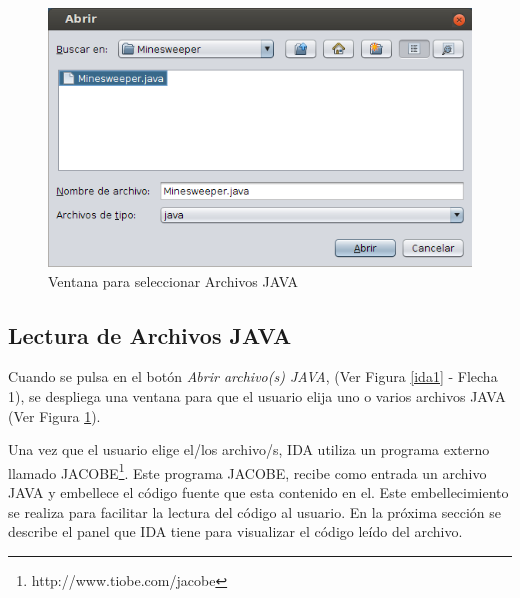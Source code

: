 \pagebreak

\begin{figure}[t] %
\centerline{%
\includegraphics[scale= 0.7]{./cap4/ida_02.png}
}
\caption{Ventana para seleccionar Archivos JAVA}
\label{ida2}
\end{figure}

\vspace{-1em}

\subsection{Lectura de Archivos JAVA}

Cuando se pulsa en el botón \textit{Abrir archivo(s) JAVA}, (Ver Figura \ref{ida1} - Flecha 1), se despliega una ventana para que el usuario elija uno o varios archivos JAVA (Ver Figura \ref{ida2}). 


Una vez que el usuario elige el/los archivo/s, IDA utiliza un  programa externo llamado JACOBE\footnote[1]{http://www.tiobe.com/jacobe}. Este programa JACOBE, recibe como entrada un archivo JAVA y embellece el código fuente que esta contenido en el. Este embellecimiento se realiza para facilitar la lectura del código al usuario. En la próxima sección se describe el panel que IDA tiene para visualizar el código leído del archivo.


